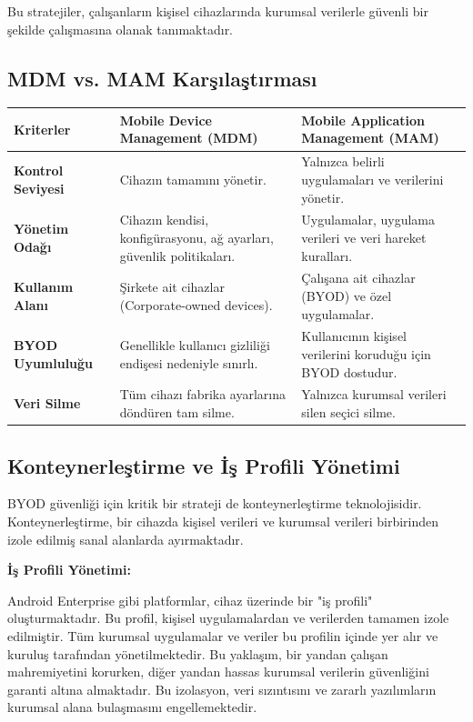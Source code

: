 Bu stratejiler, çalışanların kişisel cihazlarında kurumsal verilerle güvenli bir şekilde çalışmasına olanak tanımaktadır.

\subsection{MDM vs. MAM Karşılaştırması}

\begin{tabular}{|p{4cm}|p{6cm}|p{4cm}|}
\hline
\hline
\textbf{Kriterler} & \textbf{Mobile Device Management (MDM)} & \textbf{Mobile Application Management (MAM)} \\
\hline
\hline
\textbf{Kontrol Seviyesi} & Cihazın tamamını yönetir. & Yalnızca belirli uygulamaları ve verilerini yönetir. \\
\hline
\hline
\textbf{Yönetim Odağı} & Cihazın kendisi, konfigürasyonu, ağ ayarları, güvenlik politikaları. & Uygulamalar, uygulama verileri ve veri hareket kuralları. \\
\hline
\hline
\textbf{Kullanım Alanı} & Şirkete ait cihazlar (Corporate-owned devices). & Çalışana ait cihazlar (BYOD) ve özel uygulamalar. \\
\hline
\hline
\textbf{BYOD Uyumluluğu} & Genellikle kullanıcı gizliliği endişesi nedeniyle sınırlı. & Kullanıcının kişisel verilerini koruduğu için BYOD dostudur. \\
\hline
\hline
\textbf{Veri Silme} & Tüm cihazı fabrika ayarlarına döndüren tam silme. & Yalnızca kurumsal verileri silen seçici silme. \\
\hline
\hline
\hline
\end{tabular}

\subsection{Konteynerleştirme ve İş Profili Yönetimi}

BYOD güvenliği için kritik bir strateji de konteynerleştirme teknolojisidir. Konteynerleştirme, bir cihazda kişisel verileri ve kurumsal verileri birbirinden izole edilmiş sanal alanlarda ayırmaktadır.

\textbf{İş Profili Yönetimi:}

Android Enterprise gibi platformlar, cihaz üzerinde bir "iş profili" oluşturmaktadır. Bu profil, kişisel uygulamalardan ve verilerden tamamen izole edilmiştir. Tüm kurumsal uygulamalar ve veriler bu profilin içinde yer alır ve kuruluş tarafından yönetilmektedir. Bu yaklaşım, bir yandan çalışan mahremiyetini korurken, diğer yandan hassas kurumsal verilerin güvenliğini garanti altına almaktadır. Bu izolasyon, veri sızıntısını ve zararlı yazılımların kurumsal alana bulaşmasını engellemektedir.

